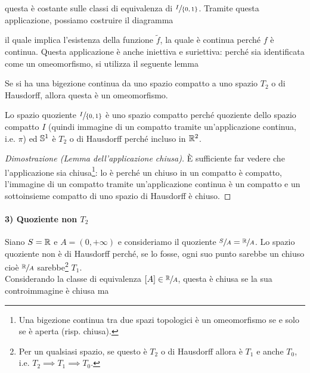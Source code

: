 questa è costante sulle classi di equivalenza di $ \sfrac{I}{\{0,1\}} $. Tramite questa applicazione, possiamo costruire il diagramma


il quale implica l'esistenza della funzione $ \tilde{f} $, la quale è continua perché $ f $ è continua. Questa applicazione è anche iniettiva e suriettiva: perché sia identificata come un omeomorfismo, si utilizza il seguente lemma

\begin{lemma}\label{lemma-clos-app}
	Se si ha una bigezione continua da uno spazio compatto a uno spazio $ T_{2} $ o di Hausdorff, allora questa è un omeomorfismo.
\end{lemma}

Lo spazio quoziente $ \sfrac{I}{\{0,1\}} $ è uno spazio compatto perché quoziente dello spazio compatto $ I $ (quindi immagine di un compatto tramite un'applicazione continua, i.e. $ \pi $) ed $ \S^{1} $ è $ T_{2} $ o di Hausdorff perché incluso in $ \R^{2} $.

\begin{proof}[Dimostrazione (Lemma dell'applicazione chiusa)]
	\`{E} sufficiente far vedere che l'applicazione sia chiusa\footnote{%
		Una bigezione continua tra due spazi topologici è un omeomorfismo se e solo se è aperta (risp. chiusa).%
	}: lo è perché un chiuso in un compatto è compatto, l'immagine di un compatto tramite un'applicazione continua è un compatto e un sottoinsieme compatto di uno spazio di Hausdorff è chiuso.
\end{proof}

\paragraph{3) Quoziente non $ T_{2} $}

Siano $ S = \R $ e $ A = (0,+\infty) $ e consideriamo il quoziente $ \sfrac{S}{A} = \sfrac{\R}{A} $. Lo spazio quoziente non è di Hausdorff perché, se lo fosse, ogni suo punto sarebbe un chiuso cioè $ \sfrac{\R}{A} $ sarebbe\footnote{%
	Per un qualsiasi spazio, se questo è $ T_{2} $ o di Hausdorff allora è $ T_{1} $ e anche $ T_{0} $, i.e. $ T_{2} \implies T_{1} \implies T_{0} $.%
} $ T_{1} $.\\
Considerando la classe di equivalenza $ [A] \in \sfrac{\R}{A} $, questa è chiusa se la sua controimmagine è chiusa ma


